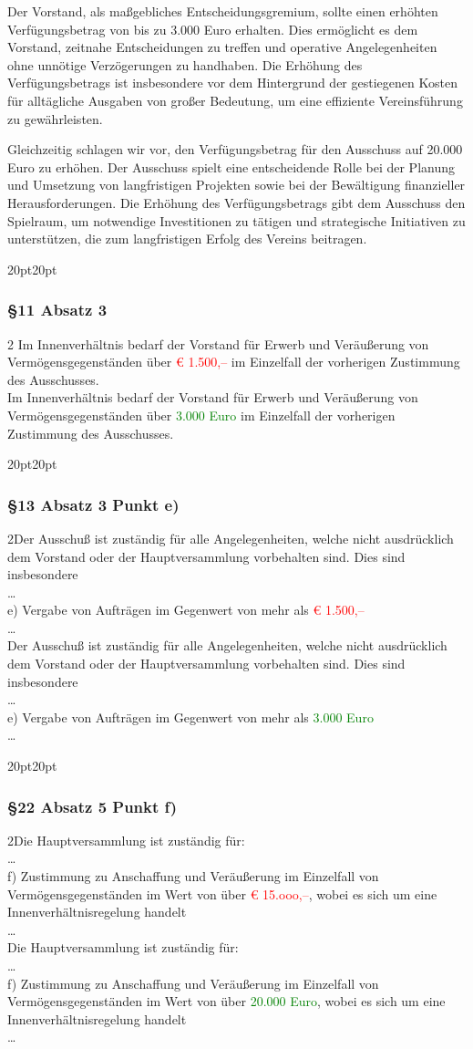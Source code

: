 \documentclass[10pt,a4paper,parskip=half]{scrartcl}
\newcommand{\new}[1]{\textcolor{Green}{#1}}
\newcommand{\old}[1]{\textcolor{Red}{#1}}
\newcommand{\change}[1]{
  \begin{adjustwidth}{20pt}{20pt}
    #1
  \end{adjustwidth}
}
\newcommand{\compare}[3]{\change{\subsubsection*{#1}\begin{multicols}{2}#2\columnbreak\\#3\end{multicols}}}
\begin{document}
  Der Vorstand, als maßgebliches Entscheidungsgremium, sollte einen erhöhten Verfügungsbetrag von bis zu 3.000 Euro erhalten. Dies ermöglicht es dem Vorstand, zeitnahe Entscheidungen zu treffen und operative Angelegenheiten ohne unnötige Verzögerungen zu handhaben. Die Erhöhung des Verfügungsbetrags ist insbesondere vor dem Hintergrund der gestiegenen Kosten für alltägliche Ausgaben von großer Bedeutung, um eine effiziente Vereinsführung zu gewährleisten.
  
  Gleichzeitig schlagen wir vor, den Verfügungsbetrag für den Ausschuss auf 20.000 Euro zu erhöhen. Der Ausschuss spielt eine entscheidende Rolle bei der Planung und Umsetzung von langfristigen Projekten sowie bei der Bewältigung finanzieller Herausforderungen. Die Erhöhung des Verfügungsbetrags gibt dem Ausschuss den Spielraum, um notwendige Investitionen zu tätigen und strategische Initiativen zu unterstützen, die zum langfristigen Erfolg des Vereins beitragen.
  
  \compare{§11 Absatz 3}{
    Im Innenverhältnis bedarf der Vorstand für Erwerb und Veräußerung von Vermögensgegenständen über \old{€ 1.500,--} im Einzelfall der vorherigen Zustimmung des Ausschusses.
  }{Im Innenverhältnis bedarf der Vorstand für Erwerb und Veräußerung von Vermögensgegenständen über \new{3.000 Euro} im Einzelfall der vorherigen Zustimmung des Ausschusses.}

  \compare{§13 Absatz 3 Punkt e)}
  {Der Ausschuß ist zuständig für alle Angelegenheiten, welche nicht ausdrücklich dem
    Vorstand oder der Hauptversammlung vorbehalten sind. Dies sind insbesondere\\\dots\\
  e) Vergabe von Aufträgen im Gegenwert von mehr als \old{€ 1.500,--}\\\dots}
  {Der Ausschuß ist zuständig für alle Angelegenheiten, welche nicht ausdrücklich dem
    Vorstand oder der Hauptversammlung vorbehalten sind. Dies sind insbesondere\\\dots\\
    e) Vergabe von Aufträgen im Gegenwert von mehr als \new{3.000 Euro}\\\dots}

    \clearpage
  \compare{§22 Absatz 5 Punkt f)}
  {Die Hauptversammlung ist zuständig für: \\ \dots\\
    f) Zustimmung zu Anschaffung und Veräußerung im Einzelfall von Vermögensgegenständen im Wert von über \old{€ 15.ooo,--}, wobei es sich um eine Innenverhältnisregelung handelt\\\dots}
  {Die Hauptversammlung ist zuständig für: \\ \dots\\f) Zustimmung zu Anschaffung und Veräußerung im Einzelfall von Vermögensgegenständen im Wert von über \new{20.000 Euro}, wobei es sich um eine Innenverhältnisregelung handelt\\\dots}
\end{document}

